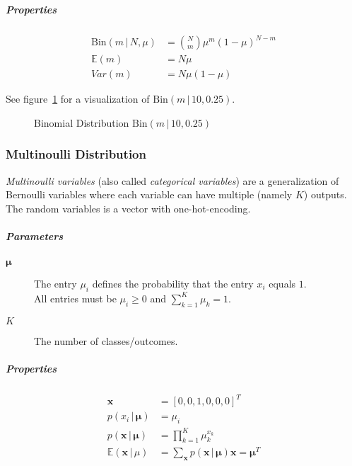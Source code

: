 \documentclass[a4paper, 11pt, accentcolor = tud3b]{tudreport}
\newcommand{\E}{\ensuremath{\mathbb{E}}}
\newcommand{\given}{\ensuremath{\,\vert\,}}
\newcommand{\Var}{\ensuremath{\textit{Var}}}
\renewcommand{\vec}[1]{\mathbf{#1}}
\begin{document}
					\subparagraph{Properties}
					\begin{align}
						\textrm{Bin}(m \given N, \mu) & = { N \choose m } \mu^m (1 - \mu)^{N - m} \\
						\E(m)                         & = N\mu                                \\
						\Var(m)                       & = N \mu (1 - \mu)
					\end{align}

					See figure~\ref{fig:binomialDistribution} for a visualization of \( \textrm{Bin}(m \given 10, 0.25) \).

					\begin{figure}
						\centering
						\caption{Binomial Distribution \( \textrm{Bin}(m \given 10, 0.25) \)}
						\label{fig:binomialDistribution}
					\end{figure}

				\subsubsection{Multinoulli Distribution}
					\emph{Multinoulli variables} (also called \emph{categorical variables}) are a generalization of Bernoulli variables where each variable can have multiple (namely \(K\)) outputs. The random variables is a vector with one-hot-encoding.

					\subparagraph{Parameters}
					\begin{description}
						\item[\(\vec{\mu}\)] The entry \(\mu_i\) defines the probability that the entry \(x_i\) equals \(1\). \\ All entries must be \( \mu_i \geq 0 \) and \( \sum_{k = 1}^{K} \mu_k = 1 \).
						\item [\(K\)] The number of classes/outcomes.
					\end{description}

					\subparagraph{Properties}
					\begin{align}
						\vec{x}                     & = [ 0, 0, 1, 0, 0, 0 ]^T                                           \\
						p(x_i \given \vec{\mu})     & = \mu_i                                                            \\
						p(\vec{x} \given \vec{\mu}) & = \prod_{k = 1}^{K} \mu_k^{x_k}                                    \\
						\E(\vec{x} \given \mu)      & = \sum_{\vec{x}} p(\vec{x} \given \vec{\mu}) \vec{x} = \vec{\mu}^T
					\end{align}
\end{document}
